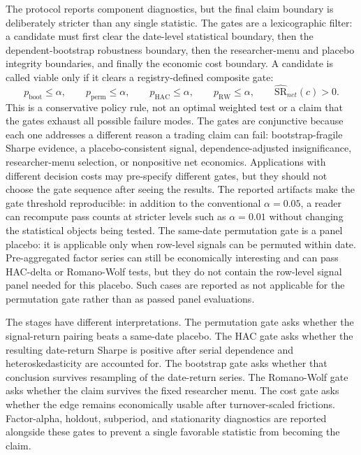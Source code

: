 \documentclass[12pt,a4paper]{article}
\newcommand{\SR}{\mathrm{SR}}
\begin{document}
The protocol reports component diagnostics, but the final claim boundary is
deliberately stricter than any single statistic.  The gates are a
lexicographic filter: a candidate must first clear the date-level
statistical boundary, then the dependent-bootstrap robustness boundary,
then the researcher-menu and placebo integrity boundaries, and finally
the economic cost boundary.  A candidate is called viable only if it
clears a registry-defined composite gate:
\[
  p_{\mathrm{boot}}\le \alpha,\qquad
  p_{\mathrm{perm}}\le \alpha,\qquad
  p_{\mathrm{HAC}}\le \alpha,\qquad
  p_{\mathrm{RW}}\le \alpha,\qquad
  \widehat{\SR}_{net}(c)>0 .
\]
This is a conservative policy rule, not an optimal weighted test or a
claim that the gates exhaust all possible failure modes.  The gates
are conjunctive because each one addresses a different reason a trading
claim can fail: bootstrap-fragile Sharpe evidence, a placebo-consistent
signal, dependence-adjusted insignificance, researcher-menu selection,
or nonpositive net economics.
Applications with different decision costs may pre-specify different
gates, but they should not choose the gate sequence after seeing the
results.
The reported artifacts make the gate threshold reproducible: in addition to
the conventional \(\alpha=0.05\), a reader can recompute pass counts at
stricter levels such as \(\alpha=0.01\) without changing the statistical
objects being tested.
The same-date permutation gate is a panel placebo: it is applicable only
when row-level signals can be permuted within date.  Pre-aggregated
factor series can still be economically interesting and can pass
HAC-delta or Romano-Wolf tests, but they do not contain the row-level
signal panel needed for this placebo.  Such cases are reported as not
applicable for the permutation gate rather than as passed panel evaluations.

The stages have different interpretations.  The permutation gate asks
whether the signal-return pairing beats a same-date placebo.  The HAC
gate asks whether the resulting date-return Sharpe is positive after
serial dependence and heteroskedasticity are accounted for.  The
bootstrap gate asks whether that conclusion survives resampling of the
date-return series.  The Romano-Wolf gate asks whether the claim survives
the fixed researcher menu.  The cost gate asks whether the edge remains
economically usable after turnover-scaled frictions.  Factor-alpha,
holdout, subperiod, and stationarity diagnostics are reported alongside
these gates to prevent a single favorable statistic from becoming the
claim.
\end{document}

